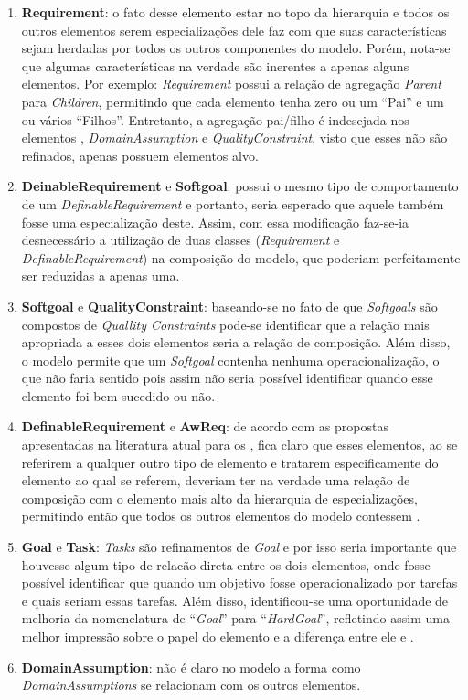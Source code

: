 \begin{enumerate}
	\item \textbf{Requirement}: o fato desse elemento estar no topo da hierarquia e todos os outros elementos serem especializações dele faz com que suas características sejam herdadas por todos os outros componentes do modelo. Porém, nota-se que algumas características na verdade são inerentes a apenas alguns elementos. Por exemplo: \textit{Requirement} possui a relação de agregação \textit{Parent} para \textit{Children}, permitindo que cada elemento tenha zero ou um ``Pai'' e um ou vários ``Filhos''. Entretanto, a agregação pai/filho é indesejada nos elementos \awreq, \textit{DomainAssumption} e \textit{QualityConstraint}, visto que esses não são refinados, apenas possuem elementos alvo.
	
	\item \textbf{DeinableRequirement} e \textbf{Softgoal}: \sofgoal possui o mesmo tipo de comportamento de um \textit{DefinableRequirement} e portanto, seria esperado que aquele também fosse uma especialização deste. Assim, com essa modificação faz-se-ia desnecessário a utilização de duas classes (\textit{Requirement} e \textit{DefinableRequirement}) na composição do modelo, que poderiam perfeitamente ser reduzidas a apenas uma.
	
	\item \textbf{Softgoal} e \textbf{QualityConstraint}: baseando-se no fato de que \textit{Softgoals} são compostos de \textit{Quallity Constraints} pode-se identificar que a relação mais apropriada a esses dois elementos seria a relação de composição. Além disso, o modelo permite que um \textit{Softgoal} contenha nenhuma operacionalização, o que não faria sentido pois assim não seria possível identificar quando esse elemento foi bem sucedido ou não.
	
	\item \textbf{DefinableRequirement} e \textbf{AwReq}: de acordo com as propostas apresentadas na literatura atual para os \awreqs, fica claro que esses elementos, ao se referirem a qualquer outro tipo de elemento e tratarem especificamente do elemento ao qual se referem, deveriam ter na verdade uma relação de composição com o elemento mais alto da hierarquia de especializações, permitindo então que todos os outros elementos do modelo contessem \awreqs.
	
	\item \textbf{Goal} e \textbf{Task}: \textit{Tasks} são refinamentos de \textit{Goal} e por isso seria importante que houvesse algum tipo de relacão direta entre os dois elementos, onde fosse possível identificar que quando um objetivo fosse operacionalizado por tarefas e quais seriam essas tarefas. Além disso, identificou-se uma oportunidade de melhoria da nomenclatura de ``\textit{Goal}'' para ``\textit{HardGoal}'', refletindo assim uma melhor impressão sobre o papel do elemento e a diferença entre ele e \sofgoal.
	
	\item \textbf{DomainAssumption}: não é claro no modelo a forma como \textit{DomainAssumptions} se relacionam com os outros elementos.
\end{enumerate}

